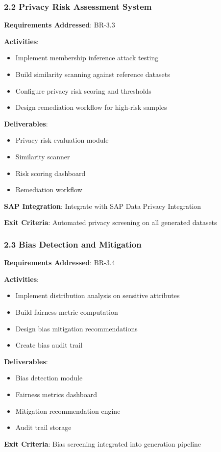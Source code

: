 \documentclass[12pt,a4paper,twoside]{report}
\begin{document}
\subsubsection{2.2 Privacy Risk Assessment System}

\begin{tcolorbox}[colback=green!5,colframe=green!70,title=2.2 Privacy Controls]
\textbf{Requirements Addressed}: BR-3.3

\textbf{Activities}:
\begin{itemize}
\item Implement membership inference attack testing
\item Build similarity scanning against reference datasets
\item Configure privacy risk scoring and thresholds
\item Design remediation workflow for high-risk samples
\end{itemize}

\textbf{Deliverables}:
\begin{itemize}
\item Privacy risk evaluation module
\item Similarity scanner
\item Risk scoring dashboard
\item Remediation workflow
\end{itemize}

\textbf{SAP Integration}: Integrate with SAP Data Privacy Integration

\textbf{Exit Criteria}: Automated privacy screening on all generated datasets
\end{tcolorbox}

\subsubsection{2.3 Bias Detection and Mitigation}

\begin{tcolorbox}[colback=green!5,colframe=green!70,title=2.3 Bias Controls]
\textbf{Requirements Addressed}: BR-3.4

\textbf{Activities}:
\begin{itemize}
\item Implement distribution analysis on sensitive attributes
\item Build fairness metric computation
\item Design bias mitigation recommendations
\item Create bias audit trail
\end{itemize}

\textbf{Deliverables}:
\begin{itemize}
\item Bias detection module
\item Fairness metrics dashboard
\item Mitigation recommendation engine
\item Audit trail storage
\end{itemize}

\textbf{Exit Criteria}: Bias screening integrated into generation pipeline
\end{tcolorbox}
\end{document}
